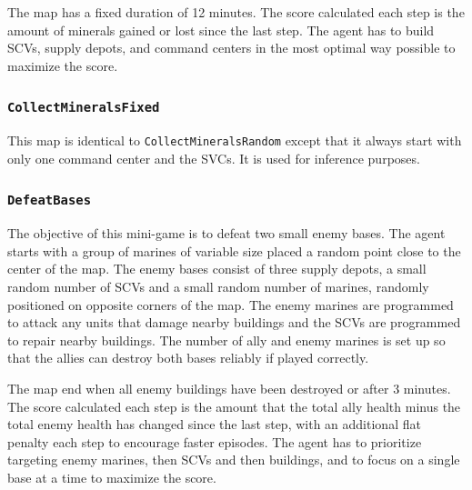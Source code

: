 The map has a fixed duration of 12 minutes. The score calculated each step is the amount of minerals gained or lost since the last step. The agent has to build SCVs, supply depots, and command centers in the most optimal way possible to maximize the score.

\subsubsection*{\texttt{CollectMineralsFixed}}

This map is identical to \texttt{CollectMineralsRandom} except that it always start with only one command center and the SVCs. It is used for inference purposes.

\subsubsection*{\texttt{DefeatBases}}

The objective of this mini-game is to defeat two small enemy bases. The agent starts with a group of marines of variable size placed a random point close to the center of the map. The enemy bases consist of three supply depots, a small random number of SCVs and a small random number of marines, randomly positioned on opposite corners of the map. The enemy marines are programmed to attack any units that damage nearby buildings and the SCVs are programmed to repair nearby buildings. The number of ally and enemy marines is set up so that the allies can destroy both bases reliably if played correctly.

The map end when all enemy buildings have been destroyed or after 3 minutes. The score calculated each step is the amount that the total ally health minus the total enemy health has changed since the last step, with an additional flat penalty each step to encourage faster episodes. The agent has to prioritize targeting enemy marines, then SCVs and then buildings, and to focus on a single base at a time to maximize the score.